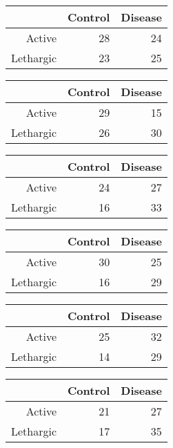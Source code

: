 \documentclass{article}\usepackage{graphicx, color}
\begin{document}
\begin{multicols}{3}
\bigskip
\begin{tabular}{rrr}
  \hline
 & Control & Disease \\ 
  \hline
Active &  28 &  24 \\ 
  Lethargic &  23 &  25 \\ 
   \hline
\end{tabular}


\bigskip
\begin{tabular}{rrr}
  \hline
 & Control & Disease \\ 
  \hline
Active &  29 &  15 \\ 
  Lethargic &  26 &  30 \\ 
   \hline
\end{tabular}


\bigskip
\begin{tabular}{rrr}
  \hline
 & Control & Disease \\ 
  \hline
Active &  24 &  27 \\ 
  Lethargic &  16 &  33 \\ 
   \hline
\end{tabular}


\bigskip
\begin{tabular}{rrr}
  \hline
 & Control & Disease \\ 
  \hline
Active &  30 &  25 \\ 
  Lethargic &  16 &  29 \\ 
   \hline
\end{tabular}


\bigskip
\begin{tabular}{rrr}
  \hline
 & Control & Disease \\ 
  \hline
Active &  25 &  32 \\ 
  Lethargic &  14 &  29 \\ 
   \hline
\end{tabular}


\bigskip
\begin{tabular}{rrr}
  \hline
 & Control & Disease \\ 
  \hline
Active &  21 &  27 \\ 
  Lethargic &  17 &  35 \\ 
   \hline
\end{tabular}



\end{multicols}
\end{document}
